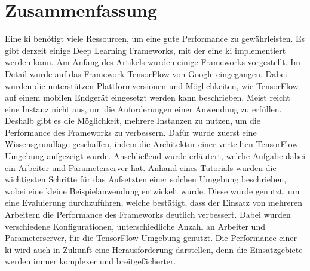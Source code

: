 \section{Zusammenfassung}
 Eine \ac{ki} benötigt viele Ressourcen, um eine gute Performance zu gewährleisten. Es gibt derzeit einige Deep Learning Frameworks, mit der eine \ac{ki} implementiert werden kann. Am Anfang des Artikels wurden einige Frameworks vorgestellt. Im Detail wurde auf das Framework TensorFlow von
 Google eingegangen. Dabei wurden die unterstützen Plattformversionen und Möglichkeiten, wie TensorFlow auf einem mobilen Endgerät eingesetzt werden kann beschrieben. Meist reicht eine Instanz nicht aus, um die Anforderungen einer Anwendung zu erfüllen. Deshalb gibt es die Möglichkeit, mehrere Instanzen zu nutzen, um die Performance des Frameworks zu verbessern. Dafür wurde zuerst eine Wissensgrundlage geschaffen, indem die Architektur einer verteilten TensorFlow Umgebung aufgezeigt wurde. Anschließend wurde erläutert, welche Aufgabe dabei ein Arbeiter und Parameterserver hat. Anhand eines Tutorials wurden die wichtigsten Schritte für das Aufsetzten einer solchen Umgebung beschrieben, wobei eine kleine Beispielanwendung entwickelt wurde. Diese wurde genutzt, um eine Evaluierung durchzuführen, welche bestätigt, dass der Einsatz von mehreren
 Arbeitern die Performance des Frameworks deutlich verbessert. Dabei wurden verschiedene Konfigurationen, unterschiedliche Anzahl an Arbeiter und Parameterserver, für die TensorFlow Umgebung genutzt. Die Performance einer \ac{ki} wird auch in Zukunft eine Herausforderung darstellen, denn die Einsatzgebiete werden immer komplexer und breitgefächerter.  
